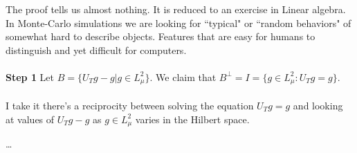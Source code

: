 \documentclass[12pt]{article}
\begin{document}
The proof tells us almost nothing.  It is reduced to an exercise in Linear algebra. In Monte-Carlo simulations we are looking for ``typical" or ``random behaviors" of somewhat hard to describe objects.  Features that are easy for humans to distinguish and yet difficult for computers.\\ \\
\textbf{Step 1} Let $B = \{ U_Tg - g | g \in L^2_\mu  \} $.  We claim that $B^\perp = I = \{ g \in L^2_\mu : U_T g= g  \}$. \\ \\
I take it there's a reciprocity between solving the equation $U_T g = g$ and looking at values of $U_T g - g$ as $g \in L_\mu^2$ varies in the Hilbert space.
\begin{thebibliography}{}

\item  \dots 

\end{thebibliography}
\end{document}
